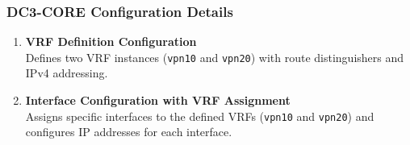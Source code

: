 \documentclass[12pt,english]{report}
\begin{document}
\subsubsection{DC3-CORE Configuration Details}
\begin{enumerate}
    \item \textbf{VRF Definition Configuration} \\
    Defines two VRF instances (\texttt{vpn10} and \texttt{vpn20}) with route distinguishers and IPv4 addressing.

    \item \textbf{Interface Configuration with VRF Assignment} \\
    Assigns specific interfaces to the defined VRFs (\texttt{vpn10} and \texttt{vpn20}) and configures IP addresses for each interface.
\end{enumerate}
\end{document}
